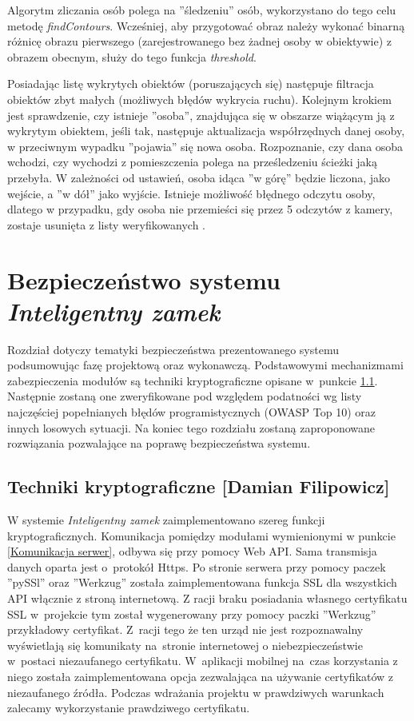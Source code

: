 \documentclass[twoside,10pt]{article}
\def\NazwaSys {\textit{Inteligentny zamek}}
\def\StudentB     {Damian Filipowicz}
\begin{document}
Algorytm zliczania osób polega na ''śledzeniu'' osób, wykorzystano do tego celu metodę \textit{findContours}. Wcześniej, aby przygotować obraz należy wykonać binarną różnicę obrazu pierwszego (zarejestrowanego bez żadnej osoby w obiektywie) z obrazem obecnym, służy do tego funkcja \textit{threshold}. 

Posiadając listę wykrytych obiektów (poruszających się) następuje filtracja obiektów zbyt małych (możliwych błędów wykrycia ruchu). Kolejnym krokiem jest sprawdzenie, czy istnieje ''osoba'', znajdująca się w obszarze wiążącym ją z wykrytym obiektem, jeśli tak, następuje aktualizacja współrzędnych danej osoby, w przeciwnym wypadku ''pojawia'' się nowa osoba. Rozpoznanie, czy dana osoba wchodzi, czy wychodzi z pomieszczenia polega na prześledzeniu ścieżki jaką przebyła. W zależności od ustawień, osoba idąca ''w górę'' będzie liczona, jako wejście, a ''w dół'' jako wyjście. Istnieje możliwość błędnego odczytu osoby, dlatego w przypadku, gdy osoba nie przemieści się przez 5 odczytów z kamery, zostaje usunięta z listy weryfikowanych \cite{rozpoznawanie_twarzy}.

\newpage
\section{Bezpieczeństwo systemu \textsl{\NazwaSys}} \label{sec:bezpieczenstwo}
Rozdział dotyczy tematyki bezpieczeństwa prezentowanego systemu podsumowując fazę projektową oraz wykonawczą. Podstawowymi mechanizmami zabezpieczenia modułów są techniki kryptograficzne opisane w~punkcie \ref{sec:techniki kryptograficzne}. Następnie zostaną one zweryfikowane pod względem podatności wg listy najczęściej popełnianych błędów programistycznych (OWASP Top 10) oraz innych losowych sytuacji. Na koniec tego rozdziału zostaną zaproponowane rozwiązania pozwalające na poprawę bezpieczeństwa systemu.

\subsection{Techniki kryptograficzne [\StudentB]}\label{sec:techniki kryptograficzne}
W systemie \textsl{\NazwaSys} zaimplementowano szereg funkcji kryptograficznych. Komunikacja pomiędzy modułami wymienionymi w punkcie \ref{Komunikacja serwer}, odbywa się przy pomocy Web API. Sama transmisja danych oparta jest o~protokół Https. Po stronie serwera przy pomocy paczek ''pySSl'' oraz ''Werkzug'' została zaimplementowana funkcja SSL dla wszystkich API włącznie z stroną internetową. Z racji braku posiadania własnego certyfikatu SSL w~projekcie tym został wygenerowany przy pomocy paczki ''Werkzug'' przykładowy certyfikat. Z~racji tego że ten urząd nie jest rozpoznawalny wyświetlają się komunikaty na~stronie internetowej o niebezpieczeństwie w~postaci niezaufanego certyfikatu. W~aplikacji mobilnej na~czas korzystania z niego została zaimplementowana opcja zezwalająca na używanie certyfikatów z niezaufanego źródła. Podczas wdrażania projektu w prawdziwych warunkach zalecamy wykorzystanie prawdziwego certyfikatu.
\end{document}
